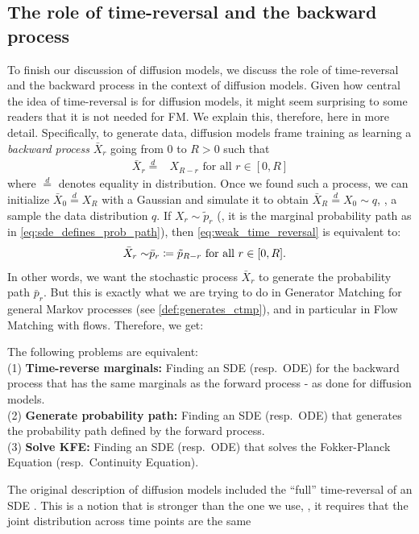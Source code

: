 \documentclass{fairmeta}
\newcommand{\highlight}[1]{{\color{metablue} \textbf{#1}}}
\numberwithin{equation}{section}
\begin{document}
\subsection{The role of time-reversal and the backward process}
To finish our discussion of diffusion models, we discuss the role of time-reversal and the backward process in the context of diffusion models. Given how central the idea of time-reversal is for diffusion models, it might seem surprising to some readers that it is not needed for FM. We explain this, therefore, here in more detail. Specifically, to generate data, diffusion models frame training as learning a \emph{backward process} $\bar{X}_r$ going from $0$ to $R>0$ such that 
\begin{align}
\label{eq:weak_time_reversal}
    \bar{X}_r \overset{d}{=}& X_{R-r} \text{ for all }r\in [0,R]
\end{align}
where $\overset{d}{=}$ denotes equality in distribution. Once we found such a process, we can initialize $\bar{X}_0\overset{d}{=}X_{R}$ with a Gaussian and simulate it to obtain $\bar{X}_{R}\overset{d}{=}X_0\sim q$, \ie, a sample the data distribution $q$. If $X_{r}\sim \tilde{p}_r$ (\ie, it is the marginal probability path as in \cref{eq:sde_defines_prob_path}), then \cref{eq:weak_time_reversal} is equivalent to:
\begin{align*}
\label{eq:prob_path_time_reversal}
\bar{X}_r \sim& \bar{p}_{r}\coloneqq\tilde{p}_{R-r}\text{ for all }r\in [0,R].
\end{align*}
In other words, we want the stochastic process $\bar{X}_r$ to generate the probability path $\bar{p}_r$. But this is exactly what we are trying to do in Generator Matching for general Markov processes (see \cref{def:generates_ctmp}), and in particular in Flow Matching with flows. Therefore, we get:
\begin{myframe}
The following problems are equivalent:\\
(1) \highlight{Time-reverse marginals: }Finding an SDE (resp.~ODE) for the backward process that has the same marginals as the forward process - as done for diffusion models.\\
(2) \highlight{Generate probability path:} Finding an SDE (resp.~ODE) that generates the probability path defined by the forward process.\\
(3) \highlight{Solve KFE:} Finding an SDE (resp.~ODE) that solves the Fokker-Planck Equation (resp.~Continuity Equation).
\end{myframe}
The original description of diffusion models included the ``full'' time-reversal of an SDE \citep{anderson1982reverse}.  This is a notion that is stronger than the one we use, \ie, it requires that the joint distribution across time points are the same
\end{document}
